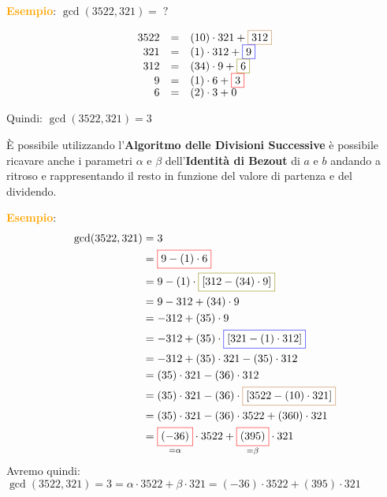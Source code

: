 \begin{boxA}
    \textcolor{orange}{\textbf{Esempio}}: $\gcd (3522, 321) = \; ?$

    {\centering
        \[
            \renewcommand{\arraystretch}{0.7}
            \begin{array}{rcl}
                3522 & = & (10) \cdot 321 + \fcolorbox{brown}{white}{312} \\
                321  & = & (1) \cdot 312 + \fcolorbox{blue}{white}{9} \\
                312  & = & (34) \cdot 9 + \fcolorbox{olive}{white}{6} \\
                9    & = & (1) \cdot 6 + \fcolorbox{red}{white}{3} \\
                6    & = & (2) \cdot 3 + 0
            \end{array}
        \]
    \par}
    Quindi: $\gcd (3522, 321) = 3$
\end{boxA}
È possibile utilizzando l'\textbf{Algoritmo delle Divisioni Successive} è possibile ricavare anche i parametri $\alpha$ e $\beta$ dell'\textbf{Identità di Bezout} di $a$ e $b$ andando a ritroso e rappresentando il resto in funzione del valore di partenza e del dividendo.
\begin{boxA}
    \textcolor{orange}{\textbf{Esempio}}:    
    \begin{align*}
        \gcd (3522, 321) &= 3 \\
        &= \fcolorbox{red}{white}{$9 - (1) \cdot 6$} \\
        &= 9 - (1) \cdot \fcolorbox{olive}{white}{$[312 - (34) \cdot 9]$} \\
        &= 9 - 312 + (34) \cdot 9 \\
        &= -312 + (35) \cdot 9 \\
        &= -312 + (35) \cdot \fcolorbox{blue}{white}{$[321 - (1) \cdot 312]$} \\
        &= -312 + (35) \cdot 321 - (35) \cdot 312 \\
        &= (35) \cdot 321 - (36) \cdot 312 \\
        &= (35) \cdot 321 - (36) \cdot \fcolorbox{brown}{white}{$[3522 - (10) \cdot 321]$} \\ 
        &= (35) \cdot 321 - (36) \cdot 3522 + (360) \cdot 321 \\
        &= \underset{= \alpha}{\fcolorbox{red}{white}{$(-36)$}} \cdot 3522 + \underset{= \beta}{\fcolorbox{red}{white}{$(395)$}} \cdot 321
    \end{align*}
    Avremo quindi: $\gcd (3522, 321) = 3 = \alpha \cdot 3522 + \beta \cdot 321 = (-36) \cdot 3522 + (395) \cdot 321$
\end{boxA}
